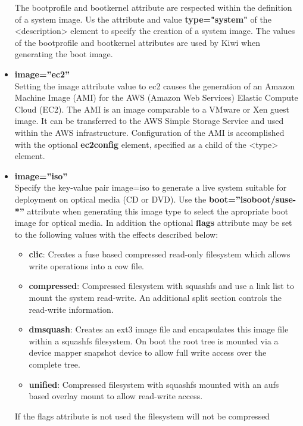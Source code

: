 \begin{itemize}
      The bootprofile and bootkernel attribute are respected within the 
      definition of a system image. Us the attribute and value 
      \textbf{type="system"} of the <description> element to specify the
      creation of a system image. The values of the bootprofile and 
      bootkernel attributes are used by Kiwi when generating the boot image.
\item \textbf{image=''ec2''}\\
      Setting the image attribute value to ec2 causes the generation of
      an Amazon Machine Image (AMI) for the AWS (Amazon Web Services) 
      Elastic Compute Cloud (EC2). The AMI is an image comparable to
      a VMware or Xen guest image. It can be transferred to the AWS 
      Simple Storage Service and used within the AWS infrastructure.
      Configuration of the AMI is accomplished with the optional
      \textbf{ec2config} element, specified as a child of the <type>
      element.
\item \textbf{image=''iso''}\\
      Specify the key-value pair image=iso to generate a live system suitable
      for deployment on optical media (CD or DVD). Use the 
      \textbf{boot=''isoboot/suse-*''} attribute when generating this image
      type to select the apropriate boot image for optical media. In 
      addition the optional \textbf{flags} attribute may be set to the
      following values with the effects described below:
      \begin{itemize}
      \item \textbf{clic}: Creates a fuse based compressed read-only
            filesystem which allows write operations into a cow file.
      \item \textbf{compressed}: Compressed filesystem with squashfs and
            use a link list to mount the system read-write. An additional
            split section controls the read-write information.
      \item \textbf{dmsquash}: Creates an ext3 image file and encapsulates
            this image file within a squashfs filesystem. On boot the root 
            tree is mounted via a device mapper snapshot device to allow full 
            write access over the complete tree.
      \item \textbf{unified}: Compressed filesystem with squashfs mounted
            with an aufs based overlay mount to allow read-write access.
      \end{itemize}
      If the flags attribute is not used the filesystem will not be compressed

\end{itemize}
